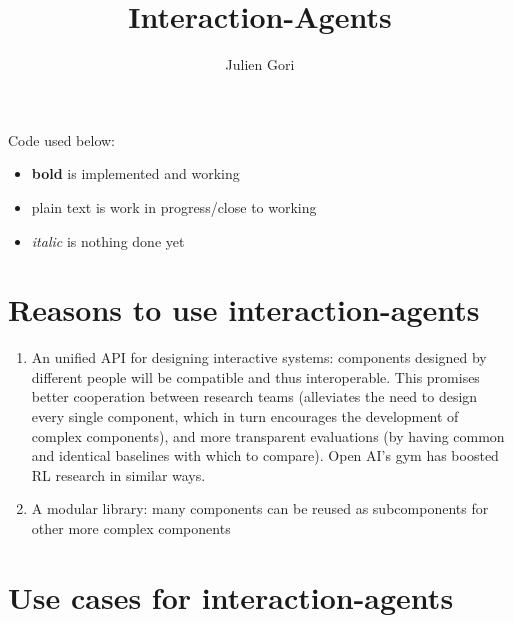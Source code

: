 \documentclass[12pt,a4paper]{article}
\title{Interaction-Agents}
\author{Julien Gori}
\begin{document}
\maketitle

Code used below:
\begin{itemize}
\item \textbf{bold} is implemented and working
\item plain text is work in progress/close to working
\item \textit{italic} is nothing done yet
\end{itemize}
	

\bigskip
\section{Reasons to use interaction-agents}

\begin{enumerate}
\item An unified API for designing interactive systems: components designed by different people will be compatible and thus interoperable. This promises better cooperation between research teams (alleviates the need to design every single component, which in turn encourages the development of complex components), and more transparent evaluations (by having common and identical baselines with which to compare). Open AI's gym has boosted RL research in similar ways.
\item A modular library: many components can be reused as subcomponents for other more complex components
\end{enumerate}


\section{Use cases for interaction-agents}
\end{document}
